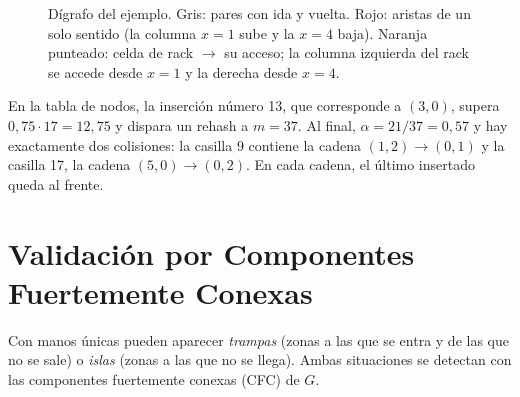 \documentclass[11pt,a4paper]{article}
\theoremstyle{definition}
\begin{document}
\begin{figure}[H]
\caption{Dígrafo del ejemplo. Gris: pares con ida y vuelta. Rojo: aristas de un solo sentido (la columna $x=1$ sube y la $x=4$ baja). Naranja punteado: celda de rack $\to$ su acceso; la columna izquierda del rack se accede desde $x=1$ y la derecha desde $x=4$.}
\label{fig:ejemplo}
\end{figure}

En la tabla de nodos, la inserción número 13, que corresponde a $(3,0)$, supera $0{,}75\cdot17=12{,}75$ y dispara un rehash a $m=37$. Al final, $\alpha=21/37=0{,}57$ y hay exactamente dos colisiones: la casilla 9 contiene la cadena $(1,2)\to(0,1)$ y la casilla 17, la cadena $(5,0)\to(0,2)$. En cada cadena, el último insertado queda al frente.

\section{Validación por Componentes Fuertemente Conexas}\label{sec:validacion}

Con manos únicas pueden aparecer \emph{trampas} (zonas a las que se entra y de las que no se sale) o \emph{islas} (zonas a las que no se llega). Ambas situaciones se detectan con las componentes fuertemente conexas (CFC) de $G$.
\end{document}
